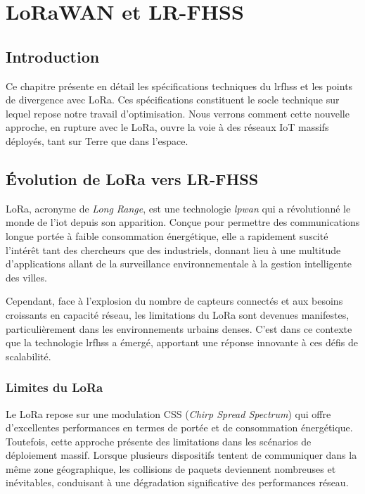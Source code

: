 \chapter{LoRaWAN et LR-FHSS}
\label{chap2}

\section{Introduction}
Ce chapitre présente en détail les spécifications techniques du \gls{lrfhss} et les points de divergence avec LoRa. Ces spécifications constituent le socle technique sur lequel repose notre travail d'optimisation. Nous verrons comment cette nouvelle approche, en rupture avec le LoRa, ouvre la voie à des réseaux IoT massifs déployés, tant sur Terre que dans l'espace.

\section{Évolution de LoRa vers LR-FHSS}
LoRa, acronyme de \textit{Long Range}, est une technologie \textit{\gls{lpwan}} qui a révolutionné le monde de l'\gls{iot} depuis son apparition. Conçue pour permettre des communications longue portée à faible consommation énergétique, elle a rapidement suscité l'intérêt tant des chercheurs que des industriels, donnant lieu à une multitude d'applications allant de la surveillance environnementale à la gestion intelligente des villes.

Cependant, face à l'explosion du nombre de capteurs connectés et aux besoins croissants en capacité réseau, les limitations du LoRa sont devenues manifestes, particulièrement dans les environnements urbains denses. C'est dans ce contexte que la technologie \gls{lrfhss} a émergé, apportant une réponse innovante à ces défis de scalabilité.

\subsection{Limites du LoRa}
Le LoRa repose sur une modulation CSS (\textit{Chirp Spread Spectrum}) qui offre d'excellentes performances en termes de portée et de consommation énergétique. Toutefois, cette approche présente des limitations dans les scénarios de déploiement massif. Lorsque plusieurs dispositifs tentent de communiquer dans la même zone géographique, les collisions de paquets deviennent nombreuses et inévitables, conduisant à une dégradation significative des performances réseau.

